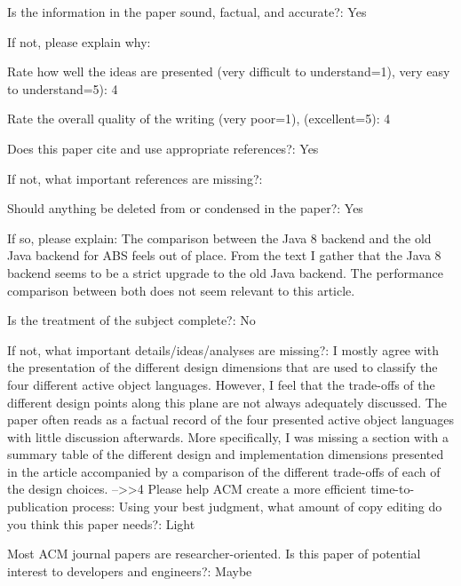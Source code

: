 \documentclass{article}
\begin{document}
Is the information in the paper sound, factual, and accurate?: Yes

If not, please explain why: 

Rate how well the ideas are presented (very difficult to understand=1), very easy to 
understand=5): 4

Rate the overall quality of the writing (very poor=1), (excellent=5): 4

Does this paper cite and use appropriate references?: Yes

If not, what important references are missing?: 

Should anything be deleted from or condensed in the paper?: Yes

If so, please explain: The comparison between the Java 8 backend and the old Java backend 
for ABS feels out of place. From the text I gather that the Java 8 backend seems to be a 
strict upgrade to the old Java backend. The performance comparison between both does not 
seem relevant to this article.

Is the treatment of the subject complete?: No

If not, what important details/ideas/analyses are missing?: I mostly agree with the 
presentation of the different design dimensions that are used to classify the four 
different active object languages. However, I feel that the trade-offs of the different 
design points along this plane are not always adequately discussed. The paper often reads 
as a factual record of the four presented active object languages with little discussion 
afterwards. More specifically, I was missing a section with a summary table of the 
different design and implementation dimensions presented in the article accompanied by a 
comparison of the different trade-offs of each of the design choices.
-->>{4}
Please help ACM create a more efficient time-to-publication process: Using your best 
judgment, what amount of copy editing do you think this paper needs?: Light

Most ACM journal papers are researcher-oriented. Is this paper of potential interest to 
developers and engineers?: Maybe
\end{document}
